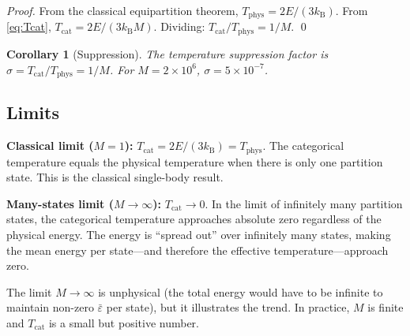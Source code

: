 \documentclass[twocolumn,10pt]{article}
\newtheorem{corollary}[theorem]{Corollary}
\newcommand{\kB}{k_{\mathrm{B}}}
\newcommand{\Tcat}{T_{\mathrm{cat}}}
\newcommand{\Tphys}{T_{\mathrm{phys}}}
\begin{document}
\begin{proof}
From the classical equipartition theorem, $\Tphys = 2E/(3\kB)$. From \eqref{eq:Tcat}, $\Tcat = 2E/(3\kB M)$. Dividing: $\Tcat/\Tphys = 1/M$. \qed
\end{proof}

\begin{corollary}[Suppression]
The temperature suppression factor is $\sigma = \Tcat/\Tphys = 1/M$. For $M = 2 \times 10^6$, $\sigma = 5 \times 10^{-7}$.
\end{corollary}

\subsection{Limits}

\textbf{Classical limit ($M = 1$):} $\Tcat = 2E/(3\kB) = \Tphys$. The categorical temperature equals the physical temperature when there is only one partition state. This is the classical single-body result.

\textbf{Many-states limit ($M \to \infty$):} $\Tcat \to 0$. In the limit of infinitely many partition states, the categorical temperature approaches absolute zero regardless of the physical energy. The energy is ``spread out'' over infinitely many states, making the mean energy per state---and therefore the effective temperature---approach zero.

The limit $M \to \infty$ is unphysical (the total energy would have to be infinite to maintain non-zero $\bar{\varepsilon}$ per state), but it illustrates the trend. In practice, $M$ is finite and $\Tcat$ is a small but positive number.
\end{document}

